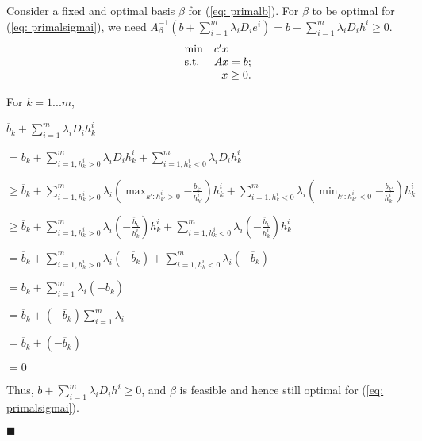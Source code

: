 Consider a fixed and optimal basis $\beta$ for (\ref{eq: primalb}). For $\beta$ to be optimal for (\ref{eq: primalsigmai}), we need $A^{-1}_{\beta}(b+\sum^{m}_{i=1}\lambda_i{}D_i{}e^i)=\overline{b}+\sum^{m}_{i=1}\lambda_i{}D_i{}h^i\geq0$.
\begin{equation}
\label{eq: primalb}
  \begin{array}{lrcll}
    \min
    & \multicolumn{4}{l}{c'x} \\
    \text{s.t.}
    & Ax=b;\\
    & x\geq0.
  \end{array}
\end{equation}

For $k=1...m$,

$\overline{b}_k+\sum^{m}_{i=1}\lambda_i{}D_i{}h^i_k$

$=\overline{b}_k+\sum^{m}_{i=1,h^i_k>0}\lambda_i{}D_i{}h^i_k+\sum^{m}_{i=1,h^i_k<0}\lambda_i{}D_i{}h^i_k$

$\geq{}\overline{b}_k+\sum^{m}_{i=1,h^i_k>0}\lambda_i{}(\max_{k':h^i_{k'}>0}{-\frac{\overline{b}_{k'}}{h^i_{k'}}})h^i_k+\sum^{m}_{i=1,h^i_k<0}\lambda_i{}(\min_{k':h^i_{k'}<0}{-\frac{\overline{b}_{k'}}{h^i_{k'}}})h^i_k$

$\geq{}\overline{b}_k+\sum^{m}_{i=1,h^i_k>0}\lambda_i{}(-\frac{\overline{b}_k}{h^i_k})h^i_k+\sum^{m}_{i=1,h^i_k<0}\lambda_i{}(-\frac{\overline{b}_k}{h^i_k})h^i_k$

$=\overline{b}_k+\sum^{m}_{i=1,h^i_k>0}\lambda_i{}(-\overline{b}_k)+\sum^{m}_{i=1,h^i_k<0}\lambda_i{}(-\overline{b}_k)$

$=\overline{b}_k+\sum^{m}_{i=1}\lambda_i{}(-\overline{b}_k)$

$=\overline{b}_k+(-\overline{b}_k)\sum^{m}_{i=1}\lambda_i{}$

$=\overline{b}_k+(-\overline{b}_k)$

$=0$

Thus, $\overline{b}+\sum^{m}_{i=1}\lambda_i{}D_i{}h^i\geq0$, and $\beta$ is feasible and hence still optimal for (\ref{eq: primalsigmai}).
\begin{flushright} $\blacksquare$ \end{flushright}